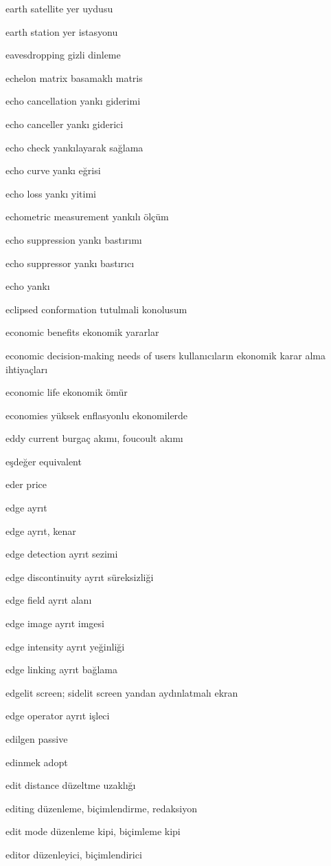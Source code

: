\documentclass[12pt,fleqn]{article}\usepackage{../../common}
\begin{document}
earth satellite yer uydusu

earth station yer istasyonu

eavesdropping gizli dinleme

echelon matrix basamaklı matris

echo cancellation yankı giderimi

echo canceller yankı giderici

echo check yankılayarak sağlama

echo curve yankı eğrisi

echo loss yankı yitimi

echometric measurement yankılı ölçüm

echo suppression yankı bastırımı

echo suppressor yankı bastırıcı

echo yankı

eclipsed conformation tutulmali konolusum

economic benefits ekonomik yararlar

economic decision-making needs of users kullanıcıların ekonomik karar alma ihtiyaçları

economic life ekonomik ömür

economies yüksek enflasyonlu ekonomilerde

eddy current burgaç akımı, foucoult akımı

eşdeğer equivalent

eder price

edge ayrıt

edge ayrıt, kenar

edge detection ayrıt sezimi

edge discontinuity ayrıt süreksizliği

edge field ayrıt alanı

edge image ayrıt imgesi

edge intensity ayrıt yeğinliği

edge linking ayrıt bağlama

edgelit screen; sidelit screen yandan aydınlatmalı ekran

edge operator ayrıt işleci

edilgen passive

edinmek adopt

edit distance düzeltme uzaklığı

editing düzenleme, biçimlendirme, redaksiyon

edit mode düzenleme kipi, biçimleme kipi

editor düzenleyici, biçimlendirici
\end{document}
